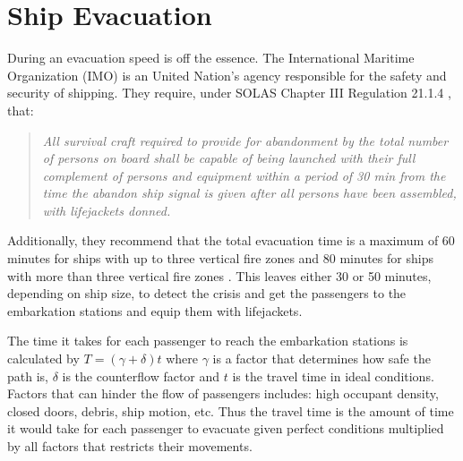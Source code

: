 \section{Ship Evacuation}

During an evacuation speed is off the essence. The International Maritime Organization (IMO) is an United Nation's agency responsible for
the safety and security of shipping. They require, under SOLAS Chapter III Regulation 21.1.4 \cite{imo}, that: 
\begin{quotation}
\textit{All survival craft required to provide for abandonment by the total number of persons on board shall be capable of being launched with their full complement of persons and equipment within a period of 30 min from the time the abandon ship signal is given after all persons have been assembled, with lifejackets donned.}
\end{quotation}
Additionally, they recommend that the total evacuation time is a maximum of 60 minutes for ships with up to three vertical fire zones and
80 minutes for ships with more than three vertical fire zones \cite{total}. This leaves either 30 or 50 minutes, depending on ship size, to detect the crisis and get the passengers to the embarkation stations and equip them with lifejackets.

The time it takes for each passenger to reach the embarkation stations is calculated by $T = (\gamma + \delta) t$ where $\gamma$ is a factor that determines how safe the path is, $\delta$ is the counterflow factor and $t$ is the travel time in ideal conditions. Factors that can hinder the flow of passengers includes: high occupant density, closed doors, debris, ship motion, etc. Thus the travel time is the amount of time it would take for each passenger to evacuate given perfect conditions multiplied by all factors that restricts their movements. 
